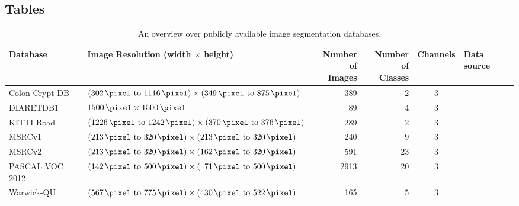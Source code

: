 
\clearpage\onecolumn
\begin{appendices}
\section{Tables}
\begin{table}[ht]
    \centering
    \begin{tabular}{llrrcl}
    \toprule
    Database        & Image Resolution (width $\times$ height) & \parbox{1cm}{\centering Number of\\Images}  & \parbox{1cm}{\centering Number of\\Classes}  & Channels & Data source\\\midrule
    Colon Crypt DB  & $(\SIrange{302}{1116}{\pixel}) \times (\SIrange{349}{875}{\pixel})$            & \num{389}  &  2 & 3        & \cite{colon-crypt-segmentation-db}\\
    DIARETDB1       & $\SI{1500}{\pixel} \times \SI{1500}{\pixel}$                                   &  \num{89}  &  4 & 3        & \cite{kalesnykiene2014diaretdb1}\\
    KITTI Road      & $(\SIrange{1226}{1242}{\pixel}) \times (\SIrange{370}{376}{\pixel})$           & \num{289}  &  2 & 3        & \cite{Fritsch2013ITSC}\\
    MSRCv1          & $(\SIrange{213}{320}{\pixel}) \times (\SIrange{213}{320}{\pixel})$             &  \num{240} &  9 & 3        & \cite{MSRC-data}\\
    MSRCv2          & $(\SIrange{213}{320}{\pixel}) \times (\SIrange{162}{320}{\pixel})$             & \num{591}  & 23 & 3        & \cite{MSRC-data}\\
    PASCAL VOC 2012 & $(\SIrange{142}{500}{\pixel}) \times (\hphantom{0}\SIrange{71}{500}{\pixel})$  & \num{2913} & 20 & 3        & \cite{pascal-voc-2012-data}  \\
    Warwick-QU      & $(\SIrange{567}{775}{\pixel}) \times (\SIrange{430}{522}{\pixel})$             & \num{165}  &  5 & 3        & \cite{coelho2009nuclear}\\
    \bottomrule
    \end{tabular}
    \caption{An overview over publicly available image segmentation databases.}
    \label{table:segmentation-databases}
\end{table}
\end{appendices}
